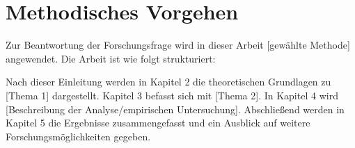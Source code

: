 \section{Methodisches Vorgehen}
Zur Beantwortung der Forschungsfrage wird in dieser Arbeit [gewählte Methode] angewendet. Die Arbeit ist wie folgt strukturiert:

Nach dieser Einleitung werden in Kapitel 2 die theoretischen Grundlagen zu [Thema 1] dargestellt. Kapitel 3 befasst sich mit [Thema 2]. In Kapitel 4 wird [Beschreibung der Analyse/empirischen Untersuchung]. Abschließend werden in Kapitel 5 die Ergebnisse zusammengefasst und ein Ausblick auf weitere Forschungsmöglichkeiten gegeben.